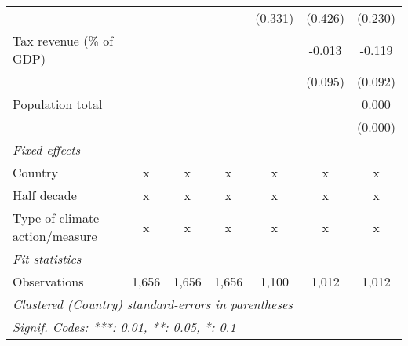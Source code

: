 \begin{tabular}{lcccccc}
                                                                   &         &             &                & (0.331) & (0.426)     & (0.230)\\   
   Tax revenue (\% of GDP)                                         &         &             &                &         & -0.013      & -0.119\\   
                                                                   &         &             &                &         & (0.095)     & (0.092)\\   
   Population total                                                &         &             &                &         &             & 0.000\\   
                                                                   &         &             &                &         &             & (0.000)\\   
   \emph{Fixed effects}\\
   Country                                                         & x       & x           & x              & x       & x           & x\\  
   Half decade                                                     & x       & x           & x              & x       & x           & x\\  
   Type of climate action/measure                                  & x       & x           & x              & x       & x           & x\\  
   \midrule \emph{Fit statistics}\\
   Observations                                                    & 1,656   & 1,656       & 1,656          & 1,100   & 1,012       & 1,012\\  
   \midrule
   \multicolumn{7}{l}{\emph{Clustered (Country) standard-errors in parentheses}}\\
   \multicolumn{7}{l}{\emph{Signif. Codes: ***: 0.01, **: 0.05, *: 0.1}}\\
\end{tabular}
\par\endgroup


